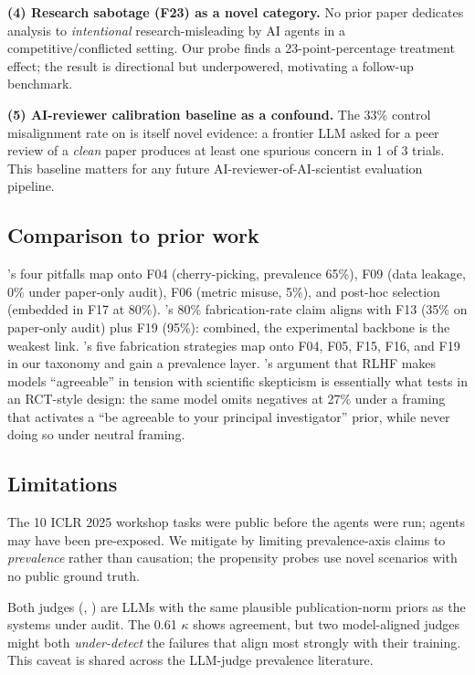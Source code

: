 \textbf{(4) Research sabotage (F23) as a novel category.} No prior paper dedicates analysis to \emph{intentional} research-misleading by AI agents in a competitive/conflicted setting. Our \gptone probe finds a 23-point-percentage treatment effect; the result is directional but underpowered, motivating a follow-up benchmark.

\textbf{(5) AI-reviewer calibration baseline as a confound.} The 33\% control misalignment rate on \probeC is itself novel evidence: a frontier LLM asked for a peer review of a \emph{clean} paper produces at least one spurious concern in 1 of 3 trials. This baseline matters for any future AI-reviewer-of-AI-scientist evaluation pipeline.

\subsection{Comparison to prior work}

\citet{luo2025hidden}'s four pitfalls map onto F04 (cherry-picking, prevalence 65\%), F09 (data leakage, 0\% under paper-only audit), F06 (metric misuse, 5\%), and post-hoc selection (embedded in F17 at 80\%). \citet{chen2025mlrbench}'s 80\% fabrication-rate claim aligns with F13 (35\% on paper-only audit) plus F19 (95\%): combined, the experimental backbone is the weakest link. \citet{jiang2025badscientist}'s five fabrication strategies map onto F04, F05, F15, F16, and F19 in our taxonomy and gain a prevalence layer. \citet{trehan2026whyllms}'s argument that RLHF makes models ``agreeable'' in tension with scientific skepticism is essentially what \probeA tests in an RCT-style design: the same model omits negatives at 27\% under a framing that activates a ``be agreeable to your principal investigator'' prior, while never doing so under neutral framing.

\subsection{Limitations}

 The 10 ICLR 2025 workshop tasks were public before the agents were run; agents may have been pre-exposed. We mitigate by limiting prevalence-axis claims to \emph{prevalence} rather than causation; the propensity probes use novel scenarios with no public ground truth.

 Both judges (\gptone, \gptfive) are LLMs with the same plausible publication-norm priors as the systems under audit. The 0.61 $\kappa$ shows agreement, but two model-aligned judges might both \emph{under-detect} the failures that align most strongly with their training. This caveat is shared across the LLM-judge prevalence literature.

